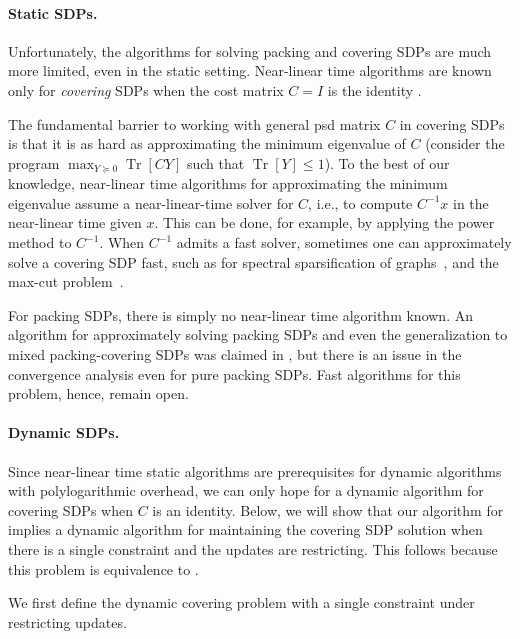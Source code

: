 \documentclass[11pt]{article}
\DeclareMathOperator{\Tr}{Tr}
\newcommand\xx{\boldsymbol{\mathit{x}}}
\newcommand\CC{\boldsymbol{\mathit{C}}}
\newcommand\II{\boldsymbol{\mathit{I}}}
\newcommand\YY{\boldsymbol{\mathit{Y}}}
\begin{document}
\paragraph{Static SDPs.}
Unfortunately, the algorithms for solving packing and covering SDPs are much more limited, even in the static setting. Near-linear time algorithms are known only for \emph{covering} SDPs when the cost matrix $\CC = \II$ is the identity \cite{peng2012faster,allen2016using}. 

The fundamental barrier to working with general psd matrix $\CC$ in covering SDPs is that it is as hard as approximating the minimum eigenvalue of $\CC$ (consider the program $\max_{\YY\succeq 0} \Tr[\CC\YY]$ such that $\Tr[\YY]\leq 1$). To the best of our knowledge, near-linear time algorithms for approximating the minimum eigenvalue assume a near-linear-time solver for $\CC$, i.e., to compute $\CC^{-1}\xx$ in the near-linear time given $\xx$. This can be done, for example, by applying the power method to $\CC^{-1}$. When $\CC^{-1}$ admits a fast solver, sometimes one can approximately solve a covering SDP fast, such as for spectral sparsification of graphs~\cite{lee2017sdp}, and the max-cut problem~\cite{arora2007combinatorial,trevisan2009max}.

For packing SDPs, there is simply no near-linear time algorithm known. An algorithm for approximately solving packing SDPs and even the generalization to mixed packing-covering SDPs was claimed in \cite{jambulapati2021positive}, but there is an issue in the convergence analysis even for pure packing SDPs. Fast algorithms for this problem, hence, remain open.

\paragraph{Dynamic SDPs.}
Since near-linear time static algorithms are prerequisites for dynamic algorithms with polylogarithmic overhead, we can only hope for a dynamic algorithm for covering SDPs when $\CC$ is an identity. 
Below, we will show that our algorithm for  implies a dynamic algorithm for maintaining the covering SDP solution when there is a single constraint and the updates are restricting. This follows because this problem is equivalence to .



We first define the dynamic covering problem with a single constraint under restricting updates.
\end{document}
